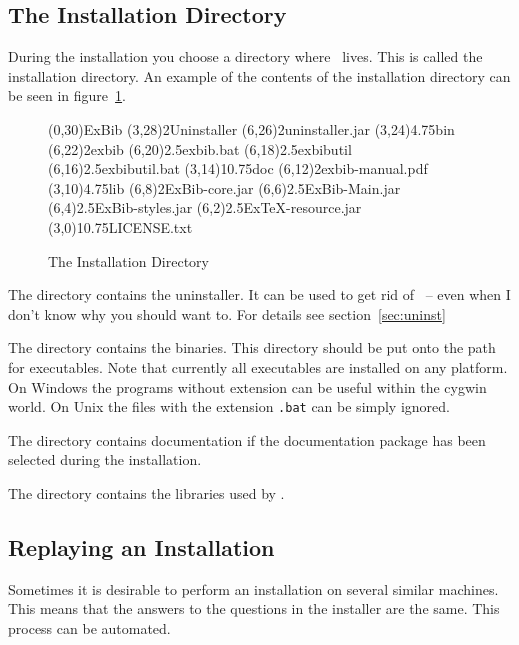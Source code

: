 \subsection{The Installation Directory}\label{sec:inst.dir}

During the installation you choose a directory where \ExBib\ lives.
This is called the installation directory. An example of the contents of the
installation directory can be seen in figure~\ref{fig:inst.dir}.

\begin{figure}[!ht]
  \centering
\begin{DirList}{200pt}{250pt}
  \TOPDIR(0,30){ExBib}
  \DIR(3,28)2{Uninstaller}
  \FILE(6,26)2{uninstaller.jar}
  \DIR(3,24){4.75}{bin}
  \FILE(6,22)2{exbib}
  \FILE(6,20){2.5}{exbib.bat}
  \FILE(6,18){2.5}{exbibutil}
  \FILE(6,16){2.5}{exbibutil.bat}
  \DIR(3,14){10.75}{doc}
  \FILE(6,12)2{exbib-manual.pdf}
  \DIR(3,10){4.75}{lib}
  \FILE(6,8){2}{ExBib-core.jar}
  \FILE(6,6){2.5}{ExBib-Main.jar}
  \FILE(6,4){2.5}{ExBib-styles.jar}
  \FILE(6,2){2.5}{ExTeX-resource.jar}
  \FILE(3,0){10.75}{LICENSE.txt}
\end{DirList}
  \caption{The Installation Directory}

  \label{fig:inst.dir}
\end{figure}

The directory  contains the uninstaller. It can be
used to get rid of \ExBib\ -- even when I don't know why you should
want to. For details see section~\ref{sec:uninst}

The directory  contains the binaries. This directory should
be put onto the path for executables. Note that currently all
executables are installed on any platform. On Windows the programs
without extension can be useful within the cygwin world. On Unix the
files with the extension \verb|.bat| can be simply ignored.

The directory  contains documentation if the documentation
package has been selected during the installation.

The directory  contains the libraries used by \ExBib.


\subsection{Replaying an Installation}\label{sec:replay}

Sometimes it is desirable to perform an installation on several
similar machines. This means that the answers to the questions in the
installer are the same. This process can be automated.

